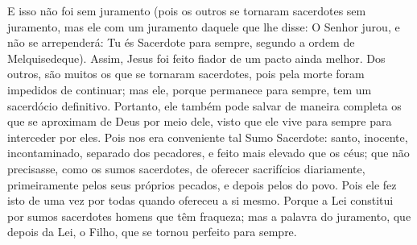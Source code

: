 {  E isso não foi
{} sem juramento (pois os outros se tornaram sacerdotes sem juramento,
  mas ele
{} com um juramento daquele que lhe disse: O Senhor jurou, e não se arrependerá: Tu és Sacerdote para sempre, segundo a ordem de Melquisedeque).
  Assim, Jesus foi feito fiador de um pacto
 ainda melhor.
  Dos outros, são muitos os que se tornaram sacerdotes, pois pela morte foram impedidos de continuar;
  mas ele, porque permanece para sempre, tem um sacerdócio definitivo.
  Portanto, ele também pode salvar de maneira completa os que se aproximam de Deus por meio dele, visto que ele vive para sempre para interceder por eles.
  Pois nos era conveniente tal Sumo Sacerdote: santo, inocente, incontaminado, separado dos pecadores, e feito mais elevado que os céus;
  que não precisasse, como os sumos sacerdotes, de oferecer sacrifícios diariamente, primeiramente pelos seus próprios pecados, e depois pelos do povo. Pois ele fez isto de uma vez por todas quando ofereceu a si mesmo.
  Porque a Lei constitui por sumos sacerdotes homens que têm fraqueza; mas a palavra do juramento, que
{} depois da Lei,
{} o Filho, que se tornou perfeito para sempre.
\par }

